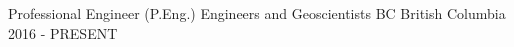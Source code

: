 


\begin{cventries}


    \cventry
    {Professional Engineer (P.Eng.)} %
    {Engineers and Geoscientists BC} %
    {British Columbia} %
    {2016 - PRESENT} %
    { %
        \begin{cvitems}
        \end{cvitems}
    }


\end{cventries}